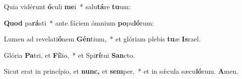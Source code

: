 \item Quia vidérunt \textbf{ó}culi \textbf{me}i~* salu\textbf{tá}re \textbf{tu}um:
\item \textbf{Quod} pa\textbf{rá}sti~* ante fáciem ó\-mnium \textbf{po}pu\textbf{ló}rum:
\item Lumen ad revelati\textbf{ó}nem \textbf{Gén}tium,~* et glóriam plebis \textbf{tu}æ \textbf{Is}rael.
\item Glória \textbf{Pa}tri, et \textbf{Fí}lio,~* et Spi\textbf{rí}tui \textbf{San}cto.
\item Sicut erat in princípio, et \textbf{nunc,} et \textbf{sem}per,~* et in sǽcula sæcu\textbf{ló}rum. \textbf{A}men.